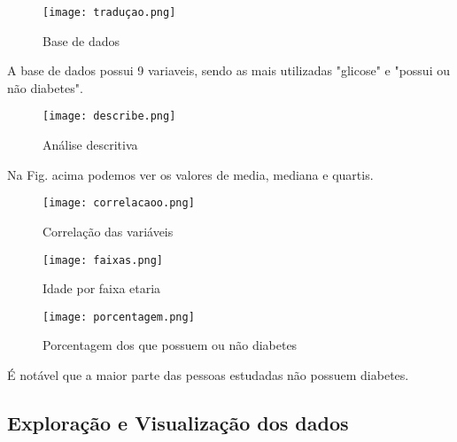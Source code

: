 \documentclass[conference]{IEEEtran}
\begin{document}
 \begin{figure}[H]
    \centering
   \caption{Base de dados}
   \texttt{[image: traduçao.png]}
\end{figure}

A base de dados possui 9 variaveis, sendo as mais utilizadas "glicose" e "possui ou não diabetes".





  \begin{figure}[H]
    \centering
    \caption{Análise descritiva}
   \texttt{[image: describe.png]}
\end{figure}

Na Fig. acima podemos ver os valores de media, mediana e quartis.

  
   
 \begin{figure}[H]
     \centering
   \caption{Correlação das variáveis}
   \texttt{[image: correlacaoo.png]}
  \end{figure}
  
 \begin{figure}[H]
     \centering
    \caption{Idade por faixa etaria}
    \texttt{[image: faixas.png]}
  \end{figure}


 \begin{figure}[H]
     \centering
    \caption{Porcentagem dos que possuem ou não diabetes}   
   \texttt{[image: porcentagem.png]}
\end{figure}

É notável que a maior parte das pessoas estudadas não possuem diabetes.


  \subsection{Exploração e Visualização dos dados}
  
\end{document}

